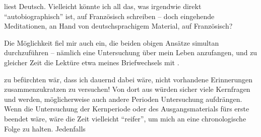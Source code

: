 liest Deutsch. Vielleicht könnte ich all das, was irgendwie direkt ``autobiographisch'' ist, auf Französisch schreiben -- doch eingehende Meditationen,  an Hand von deutschsprachigem Material, auf Französisch?

Die Möglichkeit fiel mir auch ein, die beiden obigen Ansätze simultan durchzuführen -- nämlich eine  Untersuchung über mein Leben  anzufangen, und zu gleicher Zeit die Lektüre etwa meines Briefwechsels mit .

zu befürchten wär, dass ich dauernd dabei wäre, nicht vorhandene Erinnerungen zusammenzukratzen zu versuchen! Von dort aus würden  sicher viele Kernfragen   und    werden, möglicherweise auch andere Perioden   Untersuchung aufdrängen. Wenn die Untersuchung der Kernperiode oder des Ausgangsmaterials fürs erste beendet wäre, wäre die Zeit vielleicht ``reifer'', um mich an eine chronologische Folge zu halten. Jedenfalls
